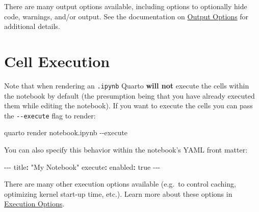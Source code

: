 \documentclass[
  letterpaper,
  DIV=11,
  numbers=noendperiod,
  oneside]{scrreprt}
\newenvironment{Shaded}{\begin{snugshade}}{\end{snugshade}}
\newcommand{\AttributeTok}[1]{\textcolor[rgb]{0.40,0.45,0.13}{#1}}
\newcommand{\CharTok}[1]{\textcolor[rgb]{0.13,0.47,0.30}{#1}}
\newcommand{\ExtensionTok}[1]{\textcolor[rgb]{0.00,0.23,0.31}{#1}}
\newcommand{\FunctionTok}[1]{\textcolor[rgb]{0.28,0.35,0.67}{#1}}
\newcommand{\KeywordTok}[1]{\textcolor[rgb]{0.00,0.23,0.31}{\textbf{#1}}}
\newcommand{\NormalTok}[1]{\textcolor[rgb]{0.00,0.23,0.31}{#1}}
\newcommand{\PreprocessorTok}[1]{\textcolor[rgb]{0.68,0.00,0.00}{#1}}
\newcommand{\StringTok}[1]{\textcolor[rgb]{0.13,0.47,0.30}{#1}}
\begin{document}
\begin{tcolorbox}
There are many output options available, including options to optionally
hide code, warnings, and/or output. See the documentation on
\href{./docs/computations/execution-options.qmd\#output-options}{Output
Options} for additional details.

\section{Cell Execution}\label{cell-execution}

Note that when rendering an \texttt{.ipynb} Quarto \textbf{will not}
execute the cells within the notebook by default (the presumption being
that you have already executed them while editing the notebook). If you
want to execute the cells you can pass the \texttt{-\/-execute} flag to
render:

\begin{codelisting}[H]

\caption{\texttt{Terminal}}

\begin{Shaded}
\begin{Highlighting}[]
\ExtensionTok{quarto}\NormalTok{ render notebook.ipynb }\AttributeTok{{-}{-}execute}
\end{Highlighting}
\end{Shaded}

\end{codelisting}

You can also specify this behavior within the notebook's YAML front
matter:

\begin{codelisting}[H]

\caption{\texttt{notebook.ipynb}}

\begin{Shaded}
\begin{Highlighting}[]
\PreprocessorTok{{-}{-}{-}}
\FunctionTok{title}\KeywordTok{:}\AttributeTok{ }\StringTok{"My Notebook"}
\FunctionTok{execute}\KeywordTok{:}\AttributeTok{ }
\AttributeTok{  }\FunctionTok{enabled}\KeywordTok{:}\AttributeTok{ }\CharTok{true}
\PreprocessorTok{{-}{-}{-}}
\end{Highlighting}
\end{Shaded}

\end{codelisting}

There are many other execution options available (e.g.~to control
caching, optimizing kernel start-up time, etc.). Learn more about these
options in \href{./docs/computations/execution-options.qmd}{Execution
Options}.


\end{tcolorbox}
\end{document}
